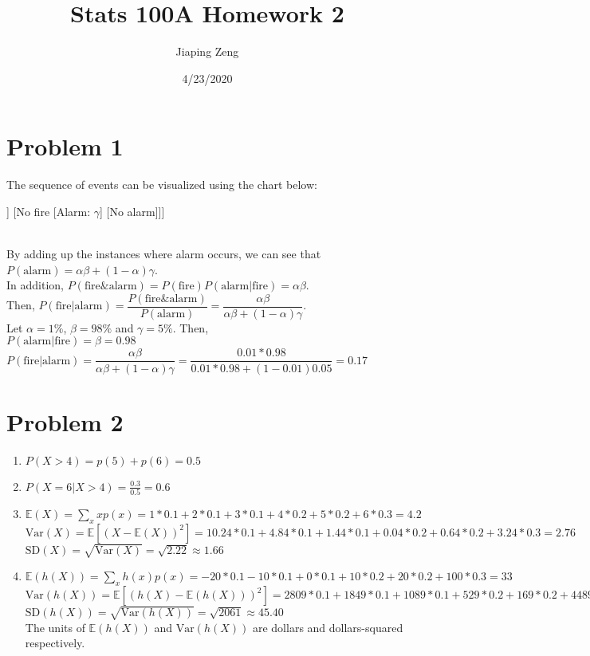 \documentclass{article}
\title{Stats 100A Homework 2}
\author{Jiaping Zeng}
\date{4/23/2020}
\begin{document}
\maketitle

\section*{Problem 1}
The sequence of events can be visualized using the chart below:\\
	\begin{forest}
		[Any moment [Fire: $\alpha$ [Alarm: $\beta$] [No alarm]] [No fire [Alarm: $\gamma$] [No alarm]]]
	\end{forest}\\
By adding up the instances where alarm occurs, we can see that $P(\text{alarm})=\alpha\beta+(1-\alpha)\gamma$.\\
In addition, $P(\text{fire\&alarm})=P(\text{fire})P(\text{alarm}|\text{fire})=\alpha\beta$.\\
Then, $P(\text{fire}|\text{alarm})=\dfrac{P(\text{fire\&alarm})}{P(\text{alarm})}=\boxed{\dfrac{\alpha\beta}{\alpha\beta+(1-\alpha)\gamma}}$.\\
Let $\alpha=1\%$, $\beta=98\%$ and $\gamma=5\%$. Then,\\
$P(\text{alarm}|\text{fire})=\beta=0.98$\\
$P(\text{fire}|\text{alarm})=\dfrac{\alpha\beta}{\alpha\beta+(1-\alpha)\gamma}=\dfrac{0.01*0.98}{0.01*0.98+(1-0.01)0.05}=0.17$

\section*{Problem 2}
\begin{enumerate}
	\item $P(X>4)=p(5)+p(6)=\boxed{0.5}$
	\item $P(X=6|X>4)=\frac{0.3}{0.5}=\boxed{0.6}$
	\item $\mathbb{E}(X)=\sum_x xp(x)=1*0.1+2*0.1+3*0.1+4*0.2+5*0.2+6*0.3=\boxed{4.2}$\\$\text{Var}(X)=\mathbb{E}[(X-\mathbb{E}(X))^2]=10.24*0.1+4.84*0.1+1.44*0.1+0.04*0.2+0.64*0.2+3.24*0.3=\boxed{2.76}$\\$\text{SD}(X)=\sqrt{\text{Var}(X)}=\sqrt{2.22}\approx\boxed{1.66}$
	\item $\mathbb{E}(h(X))=\sum_x h(x)p(x)=-20*0.1-10*0.1+0*0.1+10*0.2+20*0.2+100*0.3=\boxed{33}$\\$\text{Var}(h(X))=\mathbb{E}[(h(X)-\mathbb{E}(h(X)))^2]=2809*0.1+1849*0.1+1089*0.1+529*0.2+169*0.2+4489*0.3=\boxed{2061}$\\$\text{SD}(h(X))=\sqrt{\text{Var}(h(X))}=\sqrt{2061}\approx\boxed{45.40}$\\The units of $\mathbb{E}(h(X))$ and $\text{Var}(h(X))$ are dollars and dollars-squared respectively.
\end{enumerate}
\end{document}
